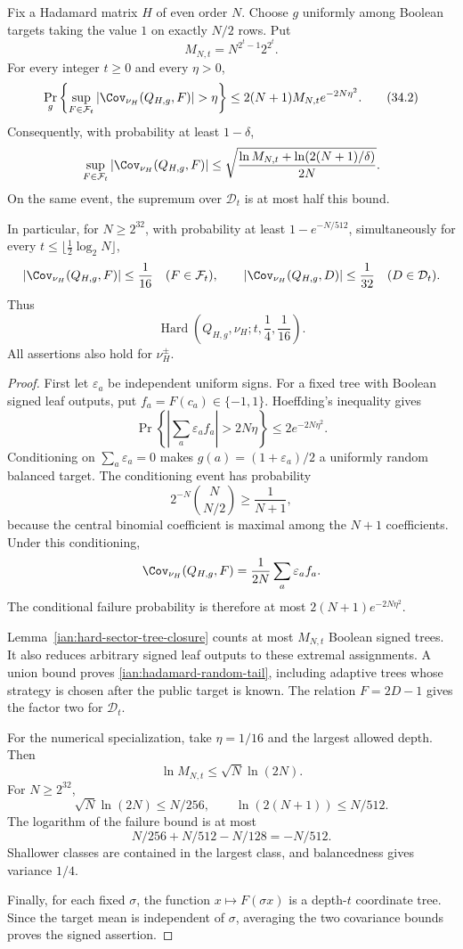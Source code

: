 \begin{lemma}
\label{ian:hadamard-random-balanced}
Fix a Hadamard matrix \(H\) of even order \(N\). Choose \(g\) uniformly among Boolean targets taking the value \(1\) on exactly \(N/2\) rows. Put
\[
 M_{N,t}=N^{2^t-1}2^{2^t}.
\]
For every integer \(t\ge0\) and every \(\eta>0\),
\[
 \Pr_g\left\{
 \sup_{F\in\mathcal F_t}
 |\Cov_{\nu_H}(Q_{H,g},F)|>\eta
 \right\}
 \le 2(N+1)M_{N,t}e^{-2N\eta^2}.
 \tag{34.2}\label{ian:hadamard-random-tail}
\]
Consequently, with probability at least \(1-\delta\),
\[
 \sup_{F\in\mathcal F_t}|\Cov_{\nu_H}(Q_{H,g},F)|
 \le
 \sqrt{\frac{\ln M_{N,t}+
                 \ln(2(N+1)/\delta)}{2N}} .
\]
On the same event, the supremum over \(\mathcal D_t\) is at most half this bound.

In particular, for \(N\ge2^{32}\), with probability at least
\(1-e^{-N/512}\), simultaneously for every
\(t\le\lfloor\frac12\log_2N\rfloor\),
\[
 |\Cov_{\nu_H}(Q_{H,g},F)|\le\frac1{16}
 \quad(F\in\mathcal F_t),
 \qquad
 |\Cov_{\nu_H}(Q_{H,g},D)|\le\frac1{32}
 \quad(D\in\mathcal D_t).
\]
Thus
\[
 \operatorname{Hard}\left(
 Q_{H,g},\nu_H;t,\frac14,\frac1{16}\right).
\]
All assertions also hold for \(\nu_H^\pm\).
\end{lemma}
\begin{proof}
First let \(\varepsilon_a\) be independent uniform signs. For a fixed tree with Boolean signed leaf outputs, put \(f_a=F(c_a)\in\{-1,1\}\). Hoeffding's inequality gives
\[
 \Pr\left\{
 \left|\sum_a\varepsilon_af_a\right|>2N\eta
 \right\}
 \le2e^{-2N\eta^2}.
\]
Conditioning on \(\sum_a\varepsilon_a=0\) makes
\(g(a)=(1+\varepsilon_a)/2\) a uniformly random balanced target. The conditioning event has probability
\[
 2^{-N}\binom N{N/2}\ge\frac1{N+1},
\]
because the central binomial coefficient is maximal among the \(N+1\) coefficients. Under this conditioning,
\[
 \Cov_{\nu_H}(Q_{H,g},F)
 =\frac1{2N}\sum_a\varepsilon_af_a.
\]
The conditional failure probability is therefore at most
\(2(N+1)e^{-2N\eta^2}\).

Lemma~\ref{ian:hard-sector-tree-closure} counts at most \(M_{N,t}\) Boolean signed trees. It also reduces arbitrary signed leaf outputs to these extremal assignments. A union bound proves \eqref{ian:hadamard-random-tail}, including adaptive trees whose strategy is chosen after the public target is known. The relation \(F=2D-1\) gives the factor two for \(\mathcal D_t\).

For the numerical specialization, take \(\eta=1/16\) and the largest allowed depth. Then
\[
 \ln M_{N,t}\le\sqrt N\ln(2N).
\]
For \(N\ge2^{32}\),
\[
 \sqrt N\ln(2N)\le N/256,
 \qquad
 \ln(2(N+1))\le N/512.
\]
The logarithm of the failure bound is at most
\[
 N/256+N/512-N/128=-N/512.
\]
Shallower classes are contained in the largest class, and balancedness gives variance \(1/4\).

Finally, for each fixed \(\sigma\), the function \(x\mapsto F(\sigma x)\) is a depth-\(t\) coordinate tree. Since the target mean is independent of \(\sigma\), averaging the two covariance bounds proves the signed assertion.
\end{proof}

